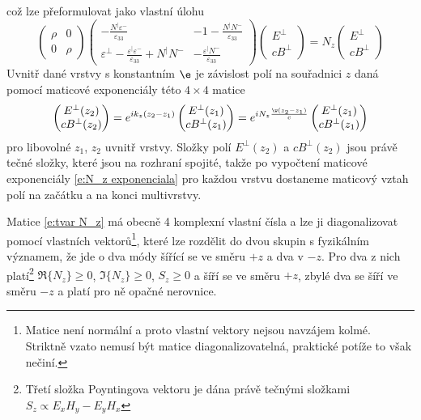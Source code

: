 což lze přeformulovat jako vlastní úlohu
\begin{equation} \label{e:tvar N_z}
\begin{pmatrix}
\rho & 0 \\ 0 & \rho
\end{pmatrix}
\begin{pmatrix}
-\frac{N^\vert \varepsilon^-}{\varepsilon_{33}} & -1 - \frac{N^\vert N^- }{\varepsilon_{33}} \\
\varepsilon^\perp-\frac{\varepsilon^\vert \varepsilon^-}{\varepsilon_{33}}+N^\vert N^- & - \frac{\varepsilon^\vert N^-}{\varepsilon_{33}}
\end{pmatrix}
\begin{pmatrix} E^\perp \\ cB^\perp \end{pmatrix}
=N_z \begin{pmatrix} E^\perp \\ cB^\perp \end{pmatrix}
\end{equation}
Uvnitř dané vrstvy s konstantním $\e$ je závislost polí na souřadnici $z$ daná pomocí maticové exponenciály této $4\times 4$ matice
\begin{equation} \label{e:N_z exponenciala}
\begin{pmatrix} E^\perp(z_2) \\ cB^\perp(z_2) \end{pmatrix} = e^{ik_z(z_2-z_1)} \begin{pmatrix} E^\perp(z_1) \\ cB^\perp(z_1) \end{pmatrix} =
e^{iN_z\frac{\w(z_2-z_1)}{c}} \begin{pmatrix} E^\perp(z_1) \\ cB^\perp(z_1) \end{pmatrix}
\end{equation}
pro libovolné $z_1$, $z_2$ uvnitř vrstvy.
Složky polí $E^\perp(z_2)$ a $cB^\perp(z_2)$ jsou právě tečné složky, které jsou na rozhraní spojité, takže po vypočtení maticové exponenciály \eqref{e:N_z exponenciala} pro každou vrstvu dostaneme maticový vztah polí na začátku a na konci multivrstvy.

Matice \eqref{e:tvar N_z} má obecně 4 komplexní vlastní čísla a lze ji diagonalizovat pomocí vlastních vektorů\footnote{Matice není normální a proto vlastní vektory nejsou navzájem kolmé. Striktně vzato nemusí být matice diagonalizovatelná, praktické potíže to však nečiní.}, které lze rozdělit do dvou skupin s fyzikálním významem, že jde o dva módy šířící se ve směru $+z$ a dva v $-z$. Pro dva z nich platí\footnote{Třetí složka Poyntingova vektoru je dána právě tečnými složkami $S_z\propto E_xH_y-E_yH_x$} $\Re\lbrace N_z \rbrace\geq0$, $\Im\lbrace N_z \rbrace\geq0$, $S_z\geq0$ a šíří se ve směru $+z$, zbylé dva se šíří ve směru $-z$ a platí pro ně opačné nerovnice.

